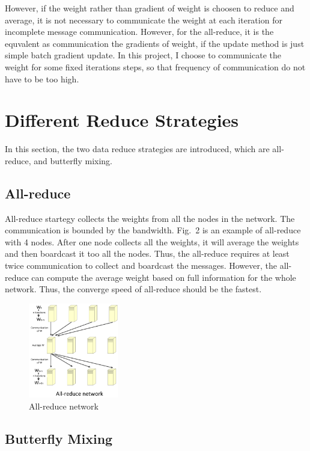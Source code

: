 \documentclass{article}
\begin{document}
However, if the weight rather than gradient of weight is choosen to reduce and average, it is not necessary to communicate the weight at each iteration for incomplete message communication. However, for the all-reduce, it is the equvalent as communication the gradients of weight, if the update method is just simple batch gradient update. In this project, I choose to communicate the weight for some fixed iterations steps, so that frequency of communication do not have to be too high.

\section{Different Reduce Strategies}
In this section, the two data reduce strategies are introduced, which are all-reduce, and butterfly mixing.

 \subsection{All-reduce}

All-reduce startegy collects the weights from all the nodes in the network. The communication is bounded by the bandwidth. Fig.~2 is an example of all-reduce with 4 nodes. After one node collects all the weights, it will average the weights and then boardcast it too all the nodes. Thus, the all-reduce requires at least twice communication to collect and boardcast the messages. However, the all-reduce can compute the average weight based on full information for the whole network. Thus, the converge speed of all-reduce should be the fastest.
\begin{figure}[h!]
  
  \centering
    \includegraphics[width=0.35\textwidth]{allreduce.jpg}
    \caption{All-reduce network}
\end{figure}
\subsection{Butterfly Mixing}
 
\end{document}
